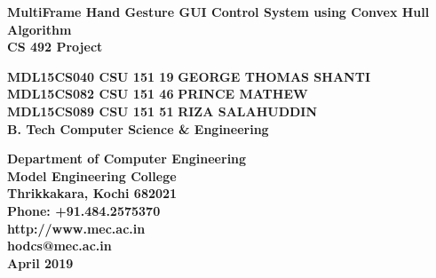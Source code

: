 \documentclass[11pt]{report}
\begin{document}
\renewcommand\bibname{References}
\pagestyle{fancy}
\fancyfoot{}
\fancyfoot[c]{\thepage}
\renewcommand{\chaptermark}[1]{
\markboth{\thechapter.\ #1}{}} 
\renewcommand{\headrulewidth}{0.1pt}
\fancyhead[r]{\slshape \leftmark}
\addtolength{\headheight}{\baselineskip}
\addtolength{\headsep}{.1in}
\lhead{\nouppercase{\rightmark}}
\rhead{\nouppercase{\leftmark}}

\begin{titlepage}
\begin{center}

\Huge{\textbf{MultiFrame Hand Gesture GUI Control System using Convex Hull Algorithm}}\\
\vspace{0.05in}
\large{\textbf{CS 492 Project\\}}
\vspace{1.2in}

\Large{\textbf{MDL15CS040 CSU 151 19}}	\hspace{.1in}	\Large{\textbf{GEORGE THOMAS SHANTI}}\\ 
\Large{\textbf{MDL15CS082 CSU 151 46}}	\hspace{.1in}	\Large{\textbf{PRINCE MATHEW}}\\ 
\Large{\textbf{MDL15CS089 CSU 151 51}}	\hspace{.1in}	\Large{\textbf{RIZA SALAHUDDIN}}\\ 
\Large{\textbf{B. Tech Computer Science \& Engineering}}


\vspace{1in}
\begin{figure}[h]
\begin{center}
\end{center}
\end{figure}
\textbf{
Department of Computer Engineering\\
Model Engineering College\\
Thrikkakara, Kochi 682021\\
Phone: +91.484.2575370\\
http://www.mec.ac.in \\
hodcs@mec.ac.in\\
\vspace{0.2in}
{\upshape April 2019}
}
\end{center}
\end{titlepage}
\end{document}
